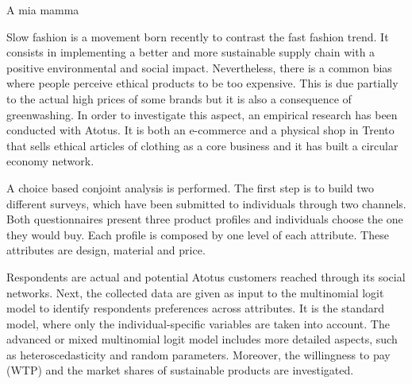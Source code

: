 \documentclass[%
    corpo=12pt,
    twoside, %
    oldstyle,
    autoretitolo,
    greek,
    evenboxes,
]{toptesi}
\begin{document}


%
{\tomo
  \paginavuota
    \begin{dedica}
        A mia mamma

    \end{dedica}
}{%
    \frontespizio %
}

\sommario 

Slow fashion is a movement born recently to contrast the fast fashion trend. It consists in implementing a better and more sustainable supply chain with a positive environmental and social impact. Nevertheless, there is a common bias where people perceive ethical products to be too expensive. This is due partially to the actual high prices of some brands but it is also a consequence of greenwashing. In order to investigate this aspect, an empirical research has been conducted with Atotus.
It is both an e-commerce and a physical shop in Trento that sells ethical articles of clothing as a core business and it has built a circular economy network. 

A choice based conjoint analysis is performed. The first step is to build two different surveys, which have been submitted to individuals through two channels. Both questionnaires present three product profiles and individuals choose the one they would buy. Each profile is composed by one level of each attribute. These attributes are design, material and price.

Respondents are actual and potential Atotus customers reached through its social networks. Next, the collected data are given as input to the multinomial logit model to identify respondents preferences across attributes. It is the standard model, where only the individual-specific variables are taken into account. The advanced or mixed multinomial logit model includes more detailed aspects, such as heteroscedasticity and random parameters. Moreover, the willingness to pay (WTP) and the market shares of sustainable products are investigated. 
\end{document}
